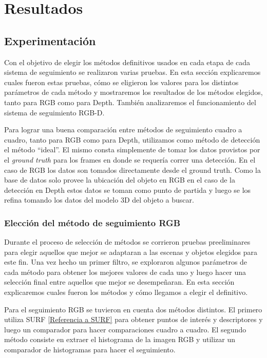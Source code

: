 \chapter{Resultados}
\section{Experimentación}
Con el objetivo de elegir los métodos definitivos usados en cada etapa de cada sistema de seguimiento se realizaron varias pruebas. En esta sección explicaremos cuales fueron estas pruebas, cómo se eligieron los valores para los distintos parámetros de cada método y mostraremos los resultados de los métodos elegidos, tanto para RGB como para Depth. También analizaremos el funcionamiento del sistema de seguimiento RGB-D.

Para lograr una buena comparación entre métodos de seguimiento cuadro a cuadro, tanto para RGB como para Depth, utilizamos como método de detección el método ``ideal''. El mismo consta simplemente de tomar los datos provistos por el \textit{ground truth} para los frames en donde se requería correr una detección. En el caso de RGB los datos son tomados directamente desde el ground truth. Como la base de datos solo provee la ubicación del objeto en RGB en el caso de la detección en Depth estos datos se toman como punto de partida y luego se los refina tomando los datos del modelo 3D del objeto a buscar.

\subsection{Elección del método de seguimiento RGB}
Durante el proceso de selección de métodos se corrieron pruebas preeliminares para elegir aquellos que mejor se adaptaran a las escenas y objetos elegidos para este fin. Una vez hecho un primer filtro, se exploraron algunos parámetros de cada método para obtener los mejores valores de cada uno y luego hacer una selección final entre aquellos que mejor se desempeñaran. En esta sección explicaremos cuales fueron los métodos y cómo llegamos a elegir el definitivo.

Para el seguimiento RGB se tuvieron en cuenta dos métodos distintos. El primero utiliza SURF \ref{Referencia a SURF} para obtener puntos de interés y descriptores y luego un comparador para hacer comparaciones cuadro a cuadro. El segundo método consiste en extraer el histograma de la imagen RGB y utilizar un comparador de histogramas para hacer el seguimiento.

